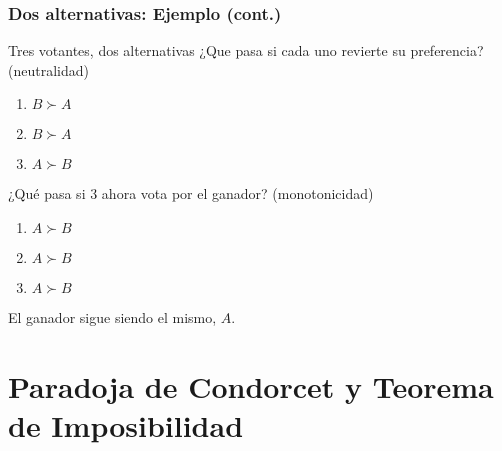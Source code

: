\documentclass[14pt,aspectratio=169]{beamer}
\begin{document}
\begin{frame}\frametitle{Dos alternativas: Ejemplo (cont.)}
\begin{block}{Tres votantes, dos alternativas}
¿Que pasa si cada uno revierte su preferencia? (neutralidad)
\begin{enumerate}
\item $B \succ A$
\item $B \succ A$
\item $A \succ B$
\end{enumerate}
¿Qué pasa si 3 ahora
vota por el ganador? (monotonicidad)
\begin{enumerate}
\item $A \succ B$
\item $A \succ B$
\item $A \succ B$
\end{enumerate}
El ganador sigue siendo el mismo, $A$.
\end{block}
\end{frame}





\section{Paradoja de Condorcet y Teorema de Imposibilidad}
\end{document}
